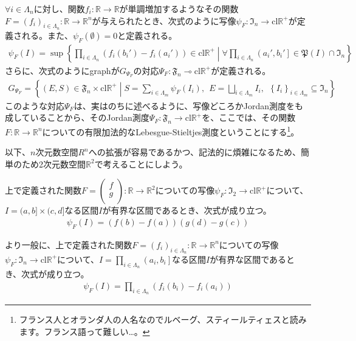 \documentclass[dvipdfmx]{jsarticle}
\begin{document}
\begin{dfn}\label{有限加法的なLebesgue-Stieltjes測度}
$\forall i \in \varLambda_{n}$に対し、関数$f_{i}:\mathbb{R} \rightarrow \mathbb{R}$が単調増加するようなその関数$F = \left( f_{i} \right)_{i \in \varLambda_{n}}:\mathbb{R} \rightarrow \mathbb{R}^{n}$が与えられたとき、次式のように写像$\psi_{F}:\mathfrak{I}_{n} \rightarrow \mathrm{cl}\mathbb{R}^{+}$が定義される。また、$\psi_{F}(\emptyset) = 0$と定義される。
\begin{align*}
\psi_{F}(I) = \sup\left\{ \prod_{i \in \varLambda_{n}} \left( f_{i}\left( b_{i}' \right) - f_{i}\left( a_{i}' \right) \right) \in \mathrm{cl}\mathbb{R}^{+} \middle| \forall\prod_{i \in \varLambda_{n}} \left( a_{i}',b_{i}' \right]\in \mathfrak{P}(I) \cap \mathfrak{I}_{n} \right\}
\end{align*}
さらに、次式のようにgraphが$G_{\varPsi_{F}}$の対応$\varPsi_{F}:\mathfrak{F}_{n} \multimap \mathrm{cl}\mathbb{R}^{+}$が定義される。
\begin{align*}
G_{\varPsi_{F}} = \left\{ (E,S) \in \mathfrak{F}_{n} \times \mathrm{cl}\mathbb{R}^{+} \middle| S = \sum_{i \in \varLambda_{m}} {\psi_{F}\left( I_{i} \right)},\ \ E = \bigsqcup_{i \in \varLambda_{m}} I_{i},\ \ \left\{ I_{i} \right\}_{i \in \varLambda_{m}} \subseteq \mathfrak{I}_{n} \right\}
\end{align*}
このような対応$\varPsi_{F}$は、実はのちに述べるように、写像どころかJordan測度をも成していることから、そのJordan測度$\varPsi_{F}:\mathfrak{F}_{n} \rightarrow \mathrm{cl}\mathbb{R}^{+}$を、ここでは、その関数$F:\mathbb{R} \rightarrow \mathbb{R}^{n}$についての有限加法的なLebesgue-Stieltjes測度ということにする\footnote{フランス人とオランダ人の人名なのでルベーグ、スティールティェスと読みます。フランス語って難しい…。}。
\end{dfn}\par
以下、$n$次元数空間$R^{n}$への拡張が容易であるかつ、記法的に煩雑になるため、簡単のため2次元数空間$\mathbb{R}^{2}$で考えることにしよう。
\begin{thm}\label{4.5.4.1} 上で定義された関数$F = \begin{pmatrix}
f \\
g \\
\end{pmatrix}:\mathbb{R} \rightarrow \mathbb{R}^{2}$についての写像$\psi_{F}:\mathfrak{I}_{2} \rightarrow \mathrm{cl}\mathbb{R}^{+}$について、$I = (a,b] \times (c,d]$なる区間$I$が有界な区間であるとき、次式が成り立つ。
\begin{align*}
\psi_{F}(I) = \left( f(b) - f(a) \right)\left( g(d) - g(c) \right)
\end{align*}\par
より一般に、上で定義された関数$F = \left( f_{i} \right)_{i \in \varLambda_{n}}:\mathbb{R} \rightarrow \mathbb{R}^{n}$についての写像$\psi_{F}:\mathfrak{I}_{n} \rightarrow \mathrm{cl}\mathbb{R}^{+}$について、$I = \prod_{i \in \varLambda_{n}} \left( a_{i},b_{i} \right]$なる区間$I$が有界な区間であるとき、次式が成り立つ。
\begin{align*}
\psi_{F}(I) = \prod_{i \in \varLambda_{n}} \left( f_{i}\left( b_{i} \right) - f_{i}\left( a_{i} \right) \right)
\end{align*}
\end{thm}
\end{document}
